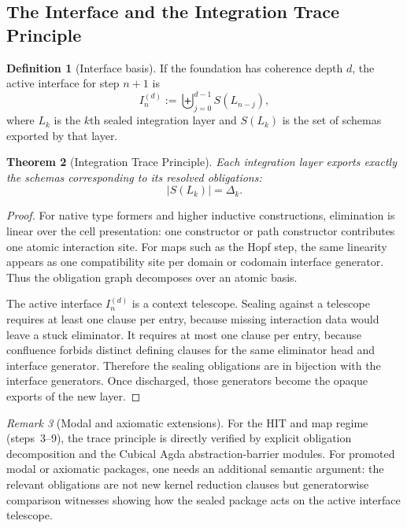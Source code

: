 \documentclass[11pt,a4paper]{article}
\theoremstyle{plain}
\newtheorem{theorem}{Theorem}[section]
\theoremstyle{definition}
\newtheorem{definition}[theorem]{Definition}
\theoremstyle{remark}
\newtheorem{remark}[theorem]{Remark}
\begin{document}
\subsection{The Interface and the Integration Trace Principle}

\begin{definition}[Interface basis]
\label{def:interface}
If the foundation has coherence depth $d$, the active interface for step $n+1$ is
\[
  I_n^{(d)}:=\biguplus_{j=0}^{d-1}S(L_{n-j}),
\]
where $L_k$ is the $k$th sealed integration layer and $S(L_k)$ is the set of schemas exported by that layer.
\end{definition}

\begin{theorem}[Integration Trace Principle]
\label{thm:trace}
Each integration layer exports exactly the schemas corresponding to its resolved obligations:
\[
  |S(L_k)|=\Delta_k.
\]
\end{theorem}

\begin{proof}
For native type formers and higher inductive constructions, elimination is linear over the cell presentation: one constructor or path constructor contributes one atomic interaction site.  For maps such as the Hopf step, the same linearity appears as one compatibility site per domain or codomain interface generator.  Thus the obligation graph decomposes over an atomic basis.

The active interface $I_n^{(d)}$ is a context telescope.  Sealing against a telescope requires at least one clause per entry, because missing interaction data would leave a stuck eliminator.  It requires at most one clause per entry, because confluence forbids distinct defining clauses for the same eliminator head and interface generator.  Therefore the sealing obligations are in bijection with the interface generators.  Once discharged, those generators become the opaque exports of the new layer.
\end{proof}

\begin{remark}[Modal and axiomatic extensions]
\label{rem:axiomatic-trace}
For the HIT and map regime (steps~3--9), the trace principle is directly verified by explicit obligation decomposition and the Cubical Agda abstraction-barrier modules.  For promoted modal or axiomatic packages, one needs an additional semantic argument: the relevant obligations are not new kernel reduction clauses but generatorwise comparison witnesses showing how the sealed package acts on the active interface telescope.
\end{remark}
\end{document}
